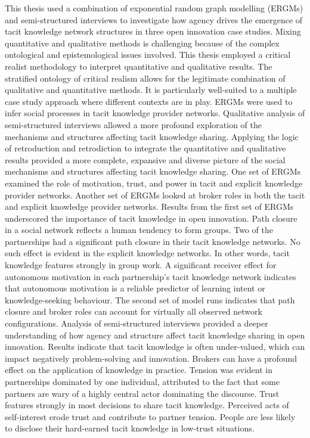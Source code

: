 \documentclass[12pt,table]{book}
\begin{document}
\noindent
This thesis used a combination of exponential random graph modelling (ERGMs) and semi-structured interviews to investigate how agency drives the emergence of tacit knowledge network structures in three open innovation case studies. Mixing quantitative and qualitative methods is challenging because of the complex ontological and epistemological issues involved. This thesis employed a critical realist methodology to interpret quantitative and qualitative results. The stratified ontology of critical realism allows for the legitimate combination of qualitative and quantitative methods. It is particularly well-suited to a multiple case study approach where different contexts are in play. ERGMs were used to infer social processes in tacit knowledge provider networks. Qualitative analysis of semi-structured interviews allowed a more profound exploration of the mechanisms and structures affecting tacit knowledge sharing. Applying the logic of retroduction and retrodiction to integrate the quantitative and qualitative results provided a more complete, expansive and diverse picture of the social mechanisms and structures affecting tacit knowledge sharing. \medskip
\noindent
One set of ERGMs examined the role of motivation, trust, and power in tacit and explicit knowledge provider networks. Another set of ERGMs looked at broker roles in both the tacit and explicit knowledge provider networks. Results from the first set of ERGMs underscored the importance of tacit knowledge in open innovation. Path closure in a social network reflects a human tendency to form groups. Two of the partnerships had a significant path closure in their tacit knowledge networks. No such effect is evident in the explicit knowledge networks. In other words, tacit knowledge features strongly in group work. A significant receiver effect for autonomous motivation in each partnership's tacit knowledge network indicates that autonomous motivation is a reliable predictor of learning intent or knowledge-seeking behaviour. The second set of model runs indicates that path closure and broker roles can account for virtually all observed network configurations. Analysis of semi-structured interviews provided a deeper understanding of how agency and structure affect tacit knowledge sharing in open innovation. Results indicate that tacit knowledge is often under-valued, which can impact negatively problem-solving and innovation. Brokers can have a profound effect on the application of knowledge in practice. Tension was evident in partnerships dominated by one individual, attributed to the fact that some partners are wary of a highly central actor dominating the discourse. Trust features strongly in most decisions to share tacit knowledge. Perceived acts of self-interest erode trust and contribute to partner tension. People are less likely to disclose their hard-earned tacit knowledge in low-trust situations. \medskip
\end{document}
